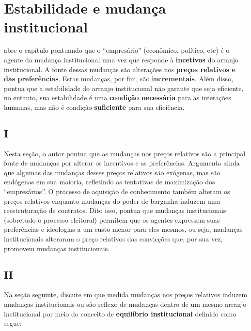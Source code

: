 \section*{Estabilidade e mudança institucional}

\autor abre o capítulo pontuando que o ``empresário'' (econômico, político, etc) é o agente da mudança institucional uma vez que responde à \textbf{incetivos} do arranjo institucional. A fonte dessas mudanças são alterações nos \textbf{preços relativos e das preferências}. Estas mudanças, por fim, são \textbf{incrementais}. Além disso, pontua que a estabilidade do arranjo institucional não garante que seja eficiente, no entanto, sua estabilidade é uma \textbf{condição necessária} para as interações humanas, mas não é condição \textbf{suficiente} para sua eficiência.

\subsection*{I}

Nesta seção, o autor pontua que as mudanças nos preços relativos são a principal fonte de mudanças por alterar os incentivos e as preferências. Argumenta ainda que algumas das mudanças desses preços relativos são exógenas, mas são endógenas em sua maioria, refletindo as tentativas de maximização dos ``empresários''. O processo de aquisição de conhecimento também alteram os preços relativos enquanto mudanças do poder de barganha induzem uma reestruturação de contratos. Dito isso, pontua que mudanças institucionais (sobretudo o processo eleitoral) permitem que os agentes expressem suas preferências e ideologias a um custo menor para eles mesmos, ou seja, mudanças institucionais alteraram o preço relativos das convicções que, por sua vez, promovem mudanças institucionais.

\subsection*{II}

Na seção seguinte, \autor discute em que medida mudanças nos preços relativos induzem mudanças institucionais ou são reflexo de mudanças dentro de um mesmo arranjo institucional por meio do conceito de \textbf{equilíbrio institucional} definido como segue:

